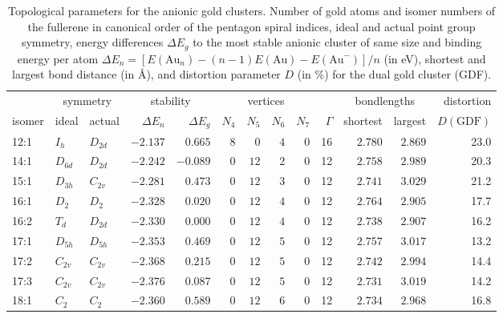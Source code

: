 \begin{table}[ht!]
	\centering
    \footnotesize{
    \caption{Topological parameters for the anionic gold clusters. Number of
    gold atoms and isomer numbers of the fullerene in canonical order of the
    pentagon spiral indices,\autocite{Fowler-atlas-2006} ideal and actual point
    group symmetry, energy differences $\Delta E_g$ to the most stable anionic
    cluster of same size and binding energy per atom $\Delta E_n =
    [E(\textrm{Au}_n)-(n-1)E(\textrm{Au})-E(\textrm{Au}^-)]/n$  (in eV),
    shortest and largest bond distance (in \AA), and distortion parameter $D$
    (in \%) for the dual gold cluster (GDF). }
	\label{tab:anion}
\begin{tabular}{lllrrrrrrrrrr}
\toprule
\multicolumn{1}{c}{  } & \multicolumn{2}{c}{ symmetry  }  & \multicolumn{2}{c}{stability} & \multicolumn{4}{c}{ vertices } & & \multicolumn{2}{c}{ bondlengths } &  distortion \\
isomer & ideal  & actual  & $\Delta E_n$ &$\Delta E_g$ & \multicolumn{1}{c}{$N_4$} & \multicolumn{1}{c}{$N_5$} & \multicolumn{1}{c}{$N_6$} & \multicolumn{1}{c}{$N_7$}& $\Gamma$ & shortest & largest   & $D(\textrm{GDF})$  \\\midrule
12:1    & $I_h$    & $D_{2d}$  & $-2.137$ & $0.665$  & $8$ & $0$  & $4$  & $0$ & 16 & $2.780$ & $2.869$  &  23.0 \\
14:1    & $D_{6d}$ & $D_{2d}$  & $-2.242$ & $-0.089$ & $0$ & $12$ & $2$  & $0$ & 12 & $2.758$ & $2.989$  &  20.3 \\
15:1    & $D_{3h}$ & $C_{2v}$  & $-2.281$ & $0.473$  & $0$ & $12$ & $3$  & $0$ & 12 & $2.741$ & $3.029$  &  21.2 \\
16:1    & $D_2$    & $D_{2 }$  & $-2.328$ & $0.020$  & $0$ & $12$ & $4$  & $0$ & 12 & $2.764$ & $2.905$  &  17.7 \\
16:2    & $T_d$    & $D_{2d}$  & $-2.330$ & $0.000$  & $0$ & $12$ & $4$  & $0$ & 12 & $2.738$ & $2.907$  &  16.2 \\
17:1    & $D_{5h}$ & $D_{5h}$  & $-2.353$ & $0.469$  & $0$ & $12$ & $5$  & $0$ & 12 & $2.757$ & $3.017$  &  13.2 \\
17:2    & $C_{2v}$ & $C_{2v}$  & $-2.368$ & $0.215$  & $0$ & $12$ & $5$  & $0$ & 12 & $2.742$ & $2.994$  &  14.4 \\
17:3    & $C_{2v}$ & $C_{2v}$  & $-2.376$ & $0.087$  & $0$ & $12$ & $5$  & $0$ & 12 & $2.731$ & $3.019$  &  14.2 \\
18:1    & $C_2$    & $C_{2 }$  & $-2.360$ & $0.589$  & $0$ & $12$ & $6$  & $0$ & 12 & $2.734$ & $2.968$  &  16.8 \\

\end{tabular}}
\end{table}
